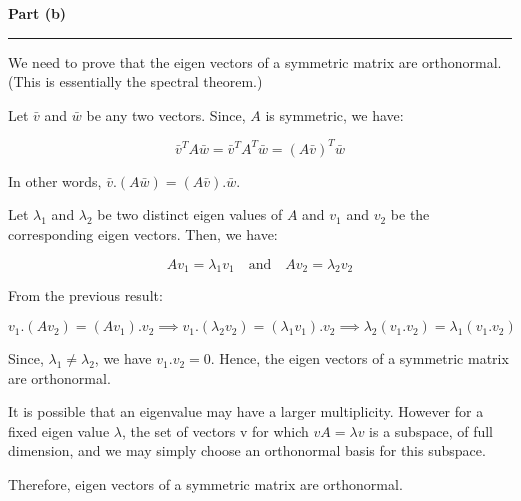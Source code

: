 \documentclass[a4paper,12pt]{article}
\newenvironment{solution}[2][]{%
    \begin{mdframed}[linecolor=blue!70!black, linewidth=2pt, roundcorner=10pt, backgroundcolor=yellow!10!white, skipabove=12pt, skipbelow=12pt]%
        \textbf{\large #2}
        \par\noindent\rule{\textwidth}{0.4pt}
}{
    \end{mdframed}
}
\begin{document}
\begin{solution}{Part (b)}
We need to prove that the eigen vectors of a symmetric matrix are orthonormal. (This is essentially the spectral theorem.)


Let $\bar{v}$ and $\bar{w}$ be any two vectors. Since, $A$ is symmetric, we have:

\begin{equation}
  \bar{v}^TA\bar{w} = \bar{v}^TA^T\bar{w} = (A\bar{v})^T\bar{w}
\end{equation}

In other words, $\bar{v} . (A\bar{w}) = (A\bar{v}) . \bar{w}$.


Let $\lambda_1$ and $\lambda_2$ be two distinct eigen values of $A$ and $v_1$ and $v_2$ be the corresponding eigen vectors. Then, we have:

\begin{equation}
  Av_1 = \lambda_1v_1 \quad \text{and} \quad Av_2 = \lambda_2v_2
\end{equation}

From the previous result:

\begin{equation}
  v_1 . (Av_2) = (Av_1) . v_2 \implies v_1 . (\lambda_2v_2) = (\lambda_1v_1) . v_2 \implies \lambda_2(v_1 . v_2) = \lambda_1(v_1 . v_2)
\end{equation}

Since, $\lambda_1 \neq \lambda_2$, we have $v_1 . v_2 = 0$. Hence, the eigen vectors of a symmetric matrix are orthonormal.


It is possible that an eigenvalue may have a larger multiplicity. However for a fixed eigen value $\lambda$, the set of vectors v for which $vA = \lambda v$ is a subspace, of full dimension, and we may simply choose an orthonormal basis for this subspace.


Therefore, eigen vectors of a symmetric matrix are orthonormal.
\end{solution}
\end{document}
